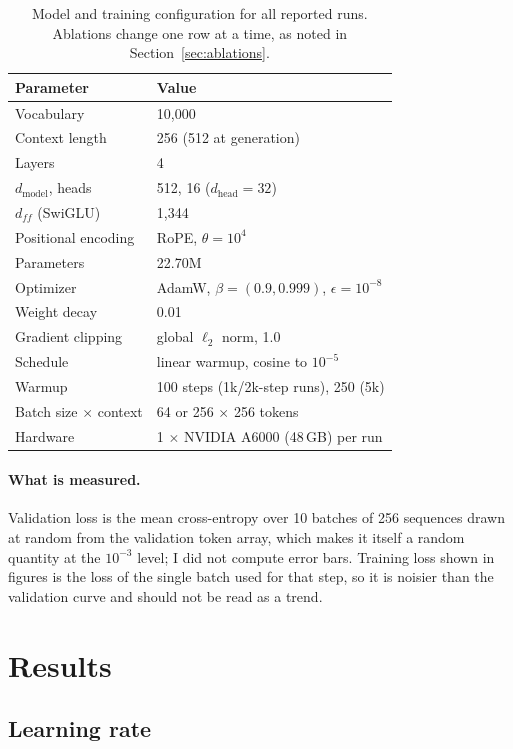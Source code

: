 \documentclass{article}
\begin{document}
\begin{table}[t]
\caption{Model and training configuration for all reported runs. Ablations change one row at a time, as noted in Section~\ref{sec:ablations}.}
\label{tab:config}
\centering
\small
\begin{tabular}{@{}ll@{}}
\toprule
Parameter & Value \\
\midrule
Vocabulary & 10{,}000 \\
Context length & 256 (512 at generation) \\
Layers & 4 \\
$d_{\text{model}}$, heads & 512, 16 ($d_{\text{head}}{=}32$) \\
$d_{ff}$ (SwiGLU) & 1{,}344 \\
Positional encoding & RoPE, $\theta{=}10^4$ \\
Parameters & 22.70M \\
\addlinespace
Optimizer & AdamW, $\beta{=}(0.9,0.999)$, $\epsilon{=}10^{-8}$ \\
Weight decay & 0.01 \\
Gradient clipping & global $\ell_2$ norm, 1.0 \\
Schedule & linear warmup, cosine to $10^{-5}$ \\
Warmup & 100 steps (1k/2k-step runs), 250 (5k) \\
Batch size $\times$ context & 64 or 256 $\times$ 256 tokens \\
Hardware & 1 $\times$ NVIDIA A6000 (48\,GB) per run \\
\bottomrule
\end{tabular}
\end{table}

\paragraph{What is measured.} Validation loss is the mean cross-entropy over 10 batches of 256 sequences drawn at random from the validation token array, which makes it itself a random quantity at the $10^{-3}$ level; I did not compute error bars. Training loss shown in figures is the loss of the single batch used for that step, so it is noisier than the validation curve and should not be read as a trend.

\section{Results}
\label{sec:results}

\subsection{Learning rate}
\label{sec:lr}
\end{document}
